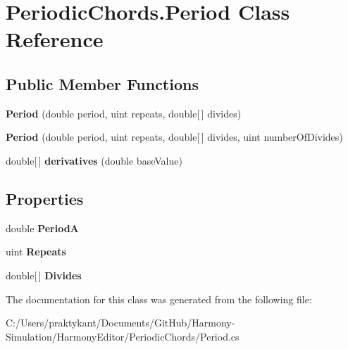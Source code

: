 \hypertarget{class_periodic_chords_1_1_period}{\section{Periodic\+Chords.\+Period Class Reference}
\label{class_periodic_chords_1_1_period}
}
\subsection*{Public Member Functions}
\begin{DoxyCompactItemize}
\item 
\hypertarget{class_periodic_chords_1_1_period_a524d6b86e4fede75ce3840f79d59bd7f}{{\bfseries Period} (double period, uint repeats, double\mbox{[}$\,$\mbox{]} divides)}\label{class_periodic_chords_1_1_period_a524d6b86e4fede75ce3840f79d59bd7f}

\item 
\hypertarget{class_periodic_chords_1_1_period_a204b109c86b615911136b10e9a2605b5}{{\bfseries Period} (double period, uint repeats, double\mbox{[}$\,$\mbox{]} divides, uint number\+Of\+Divides)}\label{class_periodic_chords_1_1_period_a204b109c86b615911136b10e9a2605b5}

\item 
\hypertarget{class_periodic_chords_1_1_period_ab3bbccd315c5a88416bbf4831458df01}{double\mbox{[}$\,$\mbox{]} {\bfseries derivatives} (double base\+Value)}\label{class_periodic_chords_1_1_period_ab3bbccd315c5a88416bbf4831458df01}

\end{DoxyCompactItemize}
\subsection*{Properties}
\begin{DoxyCompactItemize}
\item 
\hypertarget{class_periodic_chords_1_1_period_a754288fdd271c484b18d4d27a4ca8884}{double {\bfseries Period\+A}}\label{class_periodic_chords_1_1_period_a754288fdd271c484b18d4d27a4ca8884}

\item 
\hypertarget{class_periodic_chords_1_1_period_a0b93224ab6fc5af1b026dff27943ffa6}{uint {\bfseries Repeats}}\label{class_periodic_chords_1_1_period_a0b93224ab6fc5af1b026dff27943ffa6}

\item 
\hypertarget{class_periodic_chords_1_1_period_aeb122e2539791f3dbdaa41fe1562bdd0}{double\mbox{[}$\,$\mbox{]} {\bfseries Divides}}\label{class_periodic_chords_1_1_period_aeb122e2539791f3dbdaa41fe1562bdd0}

\end{DoxyCompactItemize}


The documentation for this class was generated from the following file\+:\begin{DoxyCompactItemize}
\item 
C\+:/\+Users/praktykant/\+Documents/\+Git\+Hub/\+Harmony-\/\+Simulation/\+Harmony\+Editor/\+Periodic\+Chords/Period.\+cs\end{DoxyCompactItemize}
